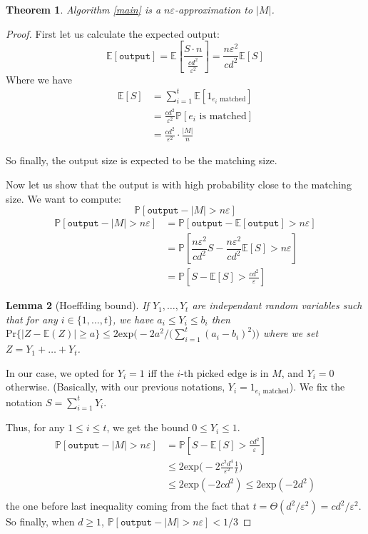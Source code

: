 \documentclass{jams-l}
\newtheorem{theorem}{Theorem}[section]
\newtheorem{lemma}[theorem]{Lemma}
\theoremstyle{definition}
\theoremstyle{remark}
\numberwithin{equation}{section}
\begin{document}
\begin{theorem}
Algorithm \ref{main} is a $n \varepsilon$-approximation to $|M|$.
\end{theorem}
\begin{proof}
First let us calculate the expected output:
\[
\mathbb{E}[\texttt{output}] = \mathbb{E}\left [\dfrac{S \cdot n}{\frac{cd^2}{\varepsilon^2}} \right ]
=\dfrac{n\varepsilon^2}{cd^2}\mathbb{E}[S]
\]
Where we have
\begin{align*}
\mathbb{E}[S]&= \sum_{i=1}^t \mathbb{E}[1_{e_i\text{ matched}}] \\
	&= \frac{cd^2}{\varepsilon^2} \mathbb{P}[e_i\text{ is matched}] \\
	&=\frac{cd^2}{\varepsilon^2} \cdot \frac{|M|}{n}
\end{align*}

So finally, the output size is expected to be the matching size.

Now let us show that the output is with high probability close to the matching size.
We want to compute:
\[
\mathbb{P}[\texttt{output} - |M| > n\varepsilon]
\]
\begin{align*}
\mathbb{P}[\texttt{output} - |M| > n\varepsilon] &= \mathbb{P}[\texttt{output} - \mathbb{E}[\texttt{output}] > n\varepsilon]\\
	&=\mathbb{P}[\dfrac{n\varepsilon^2}{cd^2}S - \dfrac{n\varepsilon^2}{cd^2}\mathbb{E}[S] 
> n\varepsilon]\\
	&=\mathbb{P}[S - \mathbb{E}[S] >  \frac{cd^2}{\varepsilon}]
\end{align*}


\begin{lemma}[Hoeffding bound] If $Y_1,\dots,Y_t$ are independant random variables such that for any $i \in\{1,\dots,t\}$, we have $a_i \leq Y_i \leq b_i$ then $\mathrm{Pr}\{|Z - \mathbb{E}(Z)| \geq a \} \leq 2 \mathrm{exp}\Big(-2a^2/\big(\sum_{i=1}^t(a_i-b_i)^2\big)\Big)$ where we set $Z = Y_1+\dots+Y_t$.
\end{lemma}

In our case, we opted for $Y_i=1$ iff the $i$-th picked edge is in $M$, 
and $Y_i = 0$ otherwise. (Basically, with our previous notations, $Y_i=1_{e_i\text{ matched}}$).
We fix the notation $S = \sum_{i=1}^t Y_i$. 

Thus, for any $1 \leq i \leq t$, we get the bound $0 \leq Y_i \leq 1$.
\begin{align*}
\mathbb{P}[\texttt{output} - |M| > n\varepsilon] &= \mathbb{P}[S - \mathbb{E}[S] >  \frac{cd^2}{\varepsilon}]\\
	&\leq 2 \mathrm{exp}\Big(-2 \frac{c^2d^4}{\varepsilon^2}\frac{1}{t}\Big) \\
	&\leq 2 \mathrm{exp}(-2 cd^2) \leq 2 \mathrm{exp}(-2 d^2)\\
\end{align*}
the one before last inequality coming from the fact that $t = \Theta(d^2/\varepsilon^2) = cd^2/\varepsilon^2$.\\
So finally, when $d \geq 1$, $\mathbb{P}[\texttt{output} - |M| > n\varepsilon]<1/3$


\end{proof}
\end{document}
